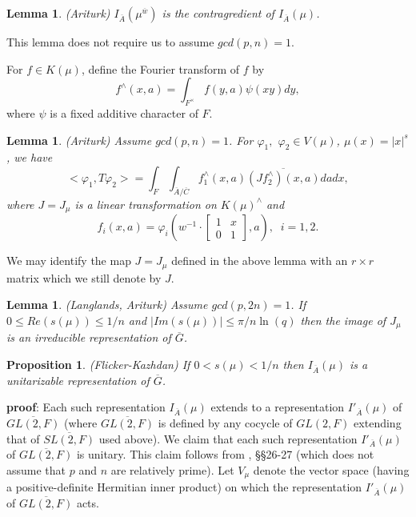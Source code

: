\documentclass[twocolumn,10pt]{article}
\newtheorem{lemma}[theorem]{Lemma}
\newtheorem{proposition}[theorem]{Proposition}
\begin{document}
\begin{lemma}
(Ariturk)
$I_{\overline{A}}(\mu ^{\overline{w}})$ is the contragredient of 
$I_{\overline{A}}(\mu )$.
\end{lemma}

This lemma does not require us to assume $gcd(p,n)=1$.

For $f\in K(\mu)$, define the Fourier transform of
$f$ by
\[
f^{\wedge }(x,a)
=\int_{F^\times}
f(y,a)\psi(xy)dy,
\]
where $\psi$ is a fixed additive character of $F$.

\begin{lemma}
(Ariturk)
Assume $gcd(p,n)=1$.
For $\varphi _1,$ $\varphi _2\in V(\mu )$, 
$\mu (x)=|x|^s$, we have 
\[
<\varphi _1,T\varphi _2>=
\int_F\int_{\overline{A}/\overline{C}}
f_1^{\wedge }(x,a)\overline{(Jf_2^{\wedge })(x,a)}dadx,
\]
where $J=J_\mu $ is a linear transformation on 
$K(\mu )^{\wedge }$ and 
\[
f_i(x,a)=\varphi _i(w^{-1}\cdot \left[ 
\begin{array}{cc}
1 & x \\ 
0 & 1
\end{array}
\right] ,a),\;\;i=1,2.
\]
\label{lemma:Jdef}
\end{lemma}

We may identify the map $J=J_\mu$ defined in the above lemma
with an $r\times r$ matrix which we still denote by $J$.

\begin{lemma}
(Langlands, Ariturk) Assume $gcd(p,2n)=1$.
If $0\leq Re(s(\mu ))\leq 1/n$ and $|Im(s(\mu ))|\leq
\pi /n\ln (q)$ then the image of $J_\mu $ is an 
irreducible representation of $\overline{G}$.
\end{lemma}

\begin{proposition}
\label{prop:fk}
(Flicker-Kazhdan)
If $0< s(\mu )< 1/n$ then $I_{\overline{A}}(\mu )$ is a 
unitarizable representation of $\overline{G}$.
\end{proposition}

{\bf proof}: 
Each such representation
$I_{\overline{A}}(\mu )$ extends to a
representation $I'_{\overline{A}}(\mu )$
of $\overline{GL(2,F)}$ (where
$\overline{GL(2,F)}$ is defined by any cocycle of
$GL(2,F)$ extending that of $\overline{SL(2,F)}$
used above).
We claim that each such representation
$I'_{\overline{A}}(\mu )$ of $\overline{GL(2,F)}$
is unitary. This claim follows from
\cite{FK}, \S\S 26-27 (which does not assume that
$p$ and $n$ are relatively prime). Let $V_\mu$ denote the
vector space (having a positive-definite Hermitian inner product)
on which the representation $I'_{\overline{A}}(\mu )$ 
of $\overline{GL(2,F)}$ acts.
\end{document}
